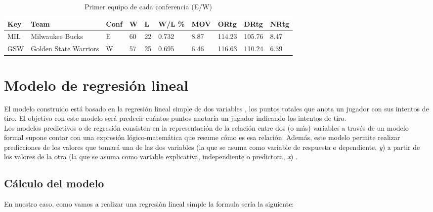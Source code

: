 \documentclass[11pt]{diazessay} %
\begin{document}
\begin{table}[!h]
	\centering
	\begin{tabular}{|l|l|l|l|l|l|l|l|l|l|}
		\hline
		\textbf{Key} & \textbf{Team}         & \textbf{Conf} & \textbf{W} & \textbf{L} & \textbf{W/L \%} & \textbf{MOV} & \textbf{ORtg} & \textbf{DRtg} & \textbf{NRtg} \\ \hline
		MIL          & Milwaukee Bucks       & E             & 60         & 22         & 0.732           & 8.87         & 114.23        & 105.76        & 8.47          \\ \hline
		GSW          & Golden State Warriors & W             & 57         & 25         & 0.695           & 6.46         & 116.63        & 110.24        & 6.39          \\ \hline
	\end{tabular}
	\caption{Primer equipo de cada conferencia (E/W)}
	\label{teamConf}
\end{table}



\section*{Modelo de regresión lineal}
El modelo construido está basado en la regresión lineal simple de dos variables \cite{regresion}, los puntos totales que anota un jugador con sus intentos de tiro. El objetivo con este modelo será predecir cuántos puntos anotaría un jugador indicando los intentos de tiro.\\

Los modelos predictivos o de regresión consisten en la representación de la relación entre dos (o más) variables a través de un modelo formal supone contar con una expresión lógico-matemática que resume cómo es esa relación. Además, este modelo permite realizar predicciones de los valores que tomará una de las dos variables (la que se asuma como variable de respuesta o dependiente, \textit{y}) a partir de los valores de la otra (la que se asuma como variable explicativa, independiente o predictora, \textit{x}) \cite{modelo_regresion}.\\

\subsection*{Cálculo del modelo}

En nuestro caso, como vamos a realizar una regresión lineal simple la formula sería la siguiente:\\
\end{document}
